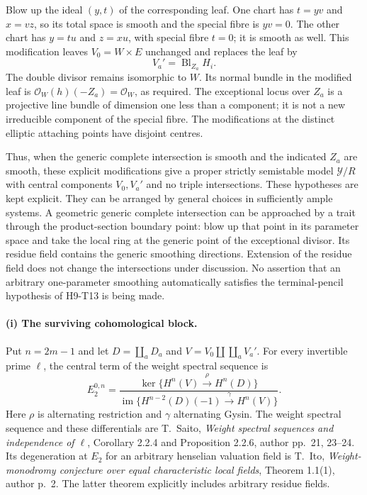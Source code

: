 \documentclass[11pt,a4paper]{article}
\begin{document}
Blow up the ideal $(y,t)$ of the corresponding leaf. One chart has
$t=yv$ and $x=vz$, so its total space is smooth and the special
fibre is $yv=0$. The other chart has $y=tu$ and $z=xu$, with
special fibre $t=0$; it is smooth as well. This modification leaves
$V_0=W\times E$ unchanged and replaces the leaf by
\[
                    V_a'=\operatorname{Bl}_{Z_a}H_i.
                                                               \tag{H9.67}
\]
The double divisor remains isomorphic to $W$. Its normal bundle in
the modified leaf is
$\mathcal O_W(h)(-Z_a)=\mathcal O_W$, as required. The exceptional
locus over $Z_a$ is a projective line bundle of dimension one less
than a component; it is not a new irreducible component of the
special fibre. The modifications at the distinct elliptic attaching
points have disjoint centres.

Thus, when the generic complete intersection is smooth and the
indicated $Z_a$ are smooth, these explicit modifications give a
proper strictly semistable model $\mathcal Y/R$ with central
components $V_0,V_a'$ and no triple intersections. These hypotheses
are kept explicit. They can be arranged by general choices in
sufficiently ample systems. A geometric generic complete intersection
can be approached by a trait through the product-section boundary
point: blow up that point in its parameter space and take the local
ring at the generic point of the exceptional divisor. Its residue
field contains the generic smoothing directions. Extension of the
residue field does not change the intersections under discussion.
No assertion that an arbitrary one-parameter smoothing automatically
satisfies the terminal-pencil hypothesis of H9-T13 is being made.

\paragraph{(i) The surviving cohomological block.}
Put $n=2m-1$ and let $D=\coprod_aD_a$ and
$V=V_0\amalg\coprod_aV_a'$. For every invertible prime $\ell$,
the central term of the weight spectral sequence is
\[
 E_2^{0,n}
   =\frac{\ker\{H^n(V)\xrightarrow{\rho}H^n(D)\}}
          {\operatorname{im}\{H^{n-2}(D)(-1)
                                \xrightarrow{\gamma}H^n(V)\}}.
                                                               \tag{H9.68}
\]
Here $\rho$ is alternating restriction and $\gamma$ alternating
Gysin. The weight spectral sequence and these differentials are
T.~Saito, \emph{Weight spectral sequences and independence of
$\ell$}, Corollary 2.2.4 and Proposition 2.2.6, author pp.~21,
23--24. Its degeneration at $E_2$ for an arbitrary henselian
valuation field is T.~Ito, \emph{Weight-monodromy conjecture over
equal characteristic local fields}, Theorem 1.1(1), author p.~2.
The latter theorem explicitly includes arbitrary residue fields.
\end{document}
